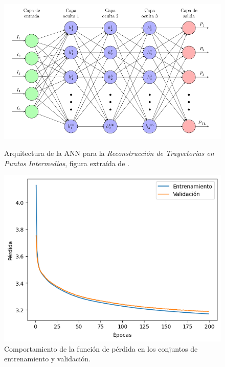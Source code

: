 \begin{figure}[!htb]
\centering
\begin{minipage}{0.50\textwidth}
    \centering
    \includegraphics[width=\textwidth]{Graphics/ann_architecture.png}
    \caption{Arquitectura de la ANN para la \textit{Reconstrucción de Trayectorias en Puntos Intermedios}, figura extraída de \cite{rodriguez2022movilidad}.}
    \label{fig:ann_architecture}
\end{minipage}%
\hfill
\begin{minipage}{0.45\textwidth}
    \centering
    \includegraphics[width=\textwidth]{Graphics/ann_loss.png}
    \caption{Comportamiento de la función de pérdida en los conjuntos de entrenamiento y validación.}
    \label{fig:ann_loss}
\end{minipage}%
\end{figure}

